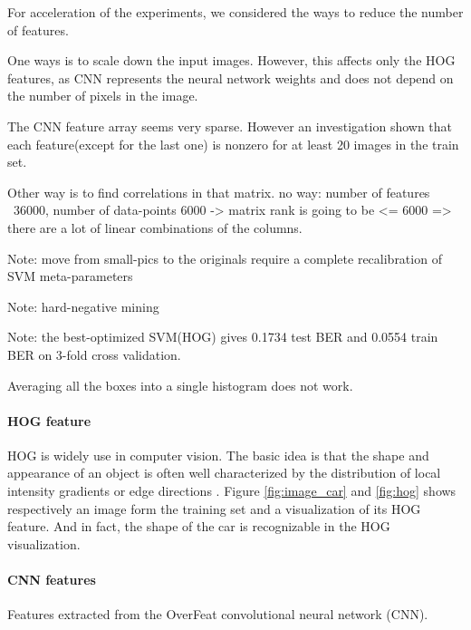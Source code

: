 \documentclass{article} %
\begin{document}
For acceleration of the experiments, we considered the ways to reduce the number of features. 

One ways is to scale down the input images. However, this affects only the HOG features, as CNN represents the neural network weights and does not depend on the number of pixels in the image.

The CNN feature array seems very sparse. However an investigation shown that each feature(except for the last one) is nonzero for at least 20 images in the train set.

Other way is to find correlations in that matrix. no way: number of features ~36000, number of data-points 6000 -> matrix rank is going to be <= 6000 => there are a lot of linear combinations of the columns.

Note: move from small-pics to the originals require a complete recalibration of SVM meta-parameters

Note: hard-negative mining

Note: the best-optimized SVM(HOG) gives 0.1734 test BER and 0.0554 train BER on 3-fold cross validation.

Averaging all the boxes into a single histogram does not work.

\paragraph{HOG feature} HOG is widely use in computer vision. 
The basic idea is that the shape and appearance of an object is often well characterized by the distribution of local intensity gradients or edge directions \cite{hog}.
Figure \ref{fig:image_car} and \ref{fig:hog} shows respectively an image form the training set and a visualization of its HOG feature.
And in fact, the shape of the car is recognizable in the HOG visualization.

\paragraph{CNN features} Features extracted from the OverFeat convolutional neural network (CNN).
\end{document}
